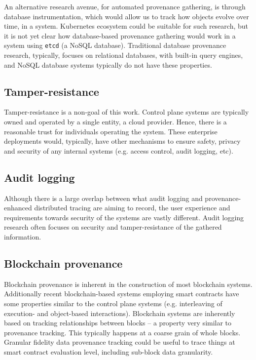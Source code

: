An alternative research avenue, for automated provenance gathering, is through database instrumentation, which would allow us to track how objects evolve over time, in a system. Kubernetes ecosystem could be suitable for such research, but it is not yet clear how database-based provenance gathering would work in a system using \texttt{etcd} (a NoSQL database). Traditional database provenance research, typically, focuses on relational databases, with built-in query engines, and NoSQL database systems typically do not have these properties.

\subsection{Tamper-resistance}

Tamper-resistance is a non-goal of this work. Control plane systems are typically owned and operated by a single entity, a cloud provider. Hence, there is a reasonable trust for individuals operating the system. These enterprise deployments would, typically, have other mechanisms to ensure safety, privacy and security of any internal systems (e.g. access control, audit logging, etc).

\subsection{Audit logging}

Although there is a large overlap between what audit logging and provenance\hyp{}enhanced distributed tracing are aiming to record, the user experience and requirements towards security of the systems are vastly different. Audit logging research often focuses on security and tamper-resistance of the gathered information.

\subsection{Blockchain provenance}

Blockchain provenance is inherent in the construction of most blockchain systems. Additionally recent blockchain-based systems employing smart contracts have some properties similar to the control plane systems (e.g. interleaving of execution- and object-based interactions). Blockchain systems are inherently based on tracking relationships between blocks -- a property very similar to provenance tracking. This typically happens at a coarse grain of whole blocks. Granular fidelity data provenance tracking could be useful to trace things at smart contract evaluation level, including sub-block data granularity.

